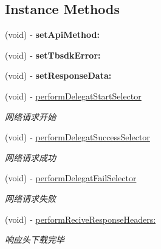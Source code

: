 \subsection*{Instance Methods}
\begin{DoxyCompactItemize}
\item 
\mbox{\label{protocol_t_b_s_d_s_k_server_rule_01-p_add385c35822574ff5c959eb770e838d5}} 
(void) -\/ {\bfseries set\+Api\+Method\+:}
\item 
\mbox{\label{protocol_t_b_s_d_s_k_server_rule_01-p_a6718bd8a08ac6acd7db79457a136b52c}} 
(void) -\/ {\bfseries set\+Tbsdk\+Error\+:}
\item 
\mbox{\label{protocol_t_b_s_d_s_k_server_rule_01-p_a79c2b38189b414d92bd7ba58a26e26d2}} 
(void) -\/ {\bfseries set\+Response\+Data\+:}
\item 
\mbox{\label{protocol_t_b_s_d_s_k_server_rule_01-p_ab90310ce6bcbe7368324d7790621622f}} 
(void) -\/ \mbox{\hyperlink{protocol_t_b_s_d_s_k_server_rule_01-p_ab90310ce6bcbe7368324d7790621622f}{perform\+Delegat\+Start\+Selector}}
\begin{DoxyCompactList}\small\item\em 网络请求开始 \end{DoxyCompactList}\item 
\mbox{\label{protocol_t_b_s_d_s_k_server_rule_01-p_a422d2c9515486690ae5c44a9c5405a31}} 
(void) -\/ \mbox{\hyperlink{protocol_t_b_s_d_s_k_server_rule_01-p_a422d2c9515486690ae5c44a9c5405a31}{perform\+Delegat\+Success\+Selector}}
\begin{DoxyCompactList}\small\item\em 网络请求成功 \end{DoxyCompactList}\item 
\mbox{\label{protocol_t_b_s_d_s_k_server_rule_01-p_a2afb4f711645da98359da884b6fbaf2c}} 
(void) -\/ \mbox{\hyperlink{protocol_t_b_s_d_s_k_server_rule_01-p_a2afb4f711645da98359da884b6fbaf2c}{perform\+Delegat\+Fail\+Selector}}
\begin{DoxyCompactList}\small\item\em 网络请求失败 \end{DoxyCompactList}\item 
\mbox{\label{protocol_t_b_s_d_s_k_server_rule_01-p_aaa24be189a924929960382861696538f}} 
(void) -\/ \mbox{\hyperlink{protocol_t_b_s_d_s_k_server_rule_01-p_aaa24be189a924929960382861696538f}{perform\+Recive\+Response\+Headers\+:}}
\begin{DoxyCompactList}\small\item\em 响应头下载完毕 \end{DoxyCompactList}\end{DoxyCompactItemize}


